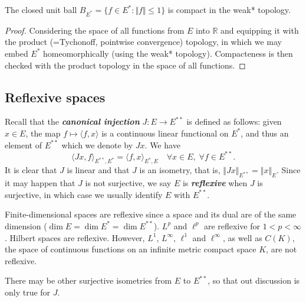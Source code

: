 \documentclass{article}
\theoremstyle{definition}
\numberwithin{equation}{section}
\newcommand{\R}{\mathbb{R}}
\begin{document}
\begin{thm}\label{BAB}
	The closed unit ball $B_{E^*}=\{f\in E^*:\Vert f\Vert\leq1\}$ is compact in the weak* topology.
\end{thm}
\begin{proof}
	Considering the space of all functions from $E$ into $\R$ and equipping it with the product (=Tychonoff, pointwise convergence) topology, in which we may embed $E^*$ homeomorphically (using the weak* topology). Compacteness is then checked with the product topology in the space of all functions.
\end{proof}

	\subsection{Reflexive spaces}
Recall that the \textbf{\textit{canonical injection}} $J:E\to E^{**}$ is defined as follows: given $x\in E$, the map $f\mapsto\langle f,x\rangle$ is a continuous linear functional on $E^*$, and thus an element of $E^{**}$ which we denote by $Jx$. We have
\[\langle Jx,f\rangle_{E^{**},E^*}=\langle f,x\rangle_{E^*,E}\quad\forall x\in E,\;\forall f\in E^{**}.\]
It is clear that $J$ is linear and that $J$ is an isometry, that is, $\Vert Jx\Vert_{E^{**}}=\Vert x\Vert_E$. Since it may happen that $J$ is not surjective, we say $E$ is \textbf{\textit{reflexive}} when $J$ is surjective, in which case we usually identify $E$ with $E^{**}$.

\begin{remark}
	Finite-dimensional spaces are reflexive since a space and its dual are of the same dimension ($\dim E=\dim E^*=\dim E^{**}$). $L^p$ and $\ell^p$ are reflexive for $1<p<\infty$. Hilbert spaces are reflexive. However, $L^1$, $L^\infty$, $\ell^1$ and $\ell^\infty$, as well as $C(K)$, the space of continuous functions on an infinite metric compact space $K$, are not reflexive.
\end{remark}
\begin{remark}
	There may be other surjective isometries from $E$ to $E^{**}$, so that out discussion is only true for $J$.
\end{remark}
\end{document}
